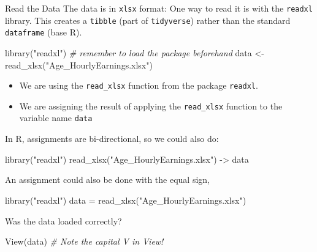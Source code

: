 \documentclass[
  11pt,
  ignorenonframetext,
  svgnames, handout, t]{beamer}
\newenvironment{Shaded}{\begin{snugshade}}{\end{snugshade}}
\newcommand{\CommentTok}[1]{\textcolor[rgb]{0.56,0.35,0.01}{\textit{#1}}}
\newcommand{\FunctionTok}[1]{\textcolor[rgb]{0.00,0.00,0.00}{#1}}
\newcommand{\NormalTok}[1]{#1}
\newcommand{\OtherTok}[1]{\textcolor[rgb]{0.56,0.35,0.01}{#1}}
\newcommand{\StringTok}[1]{\textcolor[rgb]{0.31,0.60,0.02}{#1}}
\begin{document}
\begin{frame}[fragile]{Read the Data}
\protect\hypertarget{read-the-data}{}
The data is in \texttt{xlsx} format: One way to read it is with the
\texttt{readxl} library. This creates a \texttt{tibble} (part of
\texttt{tidyverse}) rather than the standard \texttt{dataframe} (base
R).

\footnotesize

\begin{Shaded}
\begin{Highlighting}[]
\FunctionTok{library}\NormalTok{(}\StringTok{"readxl"}\NormalTok{)  }\CommentTok{\# remember to load the package beforehand}
\NormalTok{data }\OtherTok{\textless{}{-}} \FunctionTok{read\_xlsx}\NormalTok{(}\StringTok{"Age\_HourlyEarnings.xlsx"}\NormalTok{)}
\end{Highlighting}
\end{Shaded}

\normalsize

\begin{itemize}
\item
  We are using the \texttt{read\_xlsx} function from the package
  \texttt{readxl}.
\item
  We are assigning the result of applying the \texttt{read\_xlsx}
  function to the variable name \texttt{data}
\end{itemize}

In R, assignments are bi-directional, so we could also do:

\footnotesize

\begin{Shaded}
\begin{Highlighting}[]
\FunctionTok{library}\NormalTok{(}\StringTok{"readxl"}\NormalTok{)}
\FunctionTok{read\_xlsx}\NormalTok{(}\StringTok{"Age\_HourlyEarnings.xlsx"}\NormalTok{) }\OtherTok{{-}\textgreater{}}\NormalTok{ data}
\end{Highlighting}
\end{Shaded}

\normalsize

An assignment could also be done with the equal sign,

\footnotesize

\begin{Shaded}
\begin{Highlighting}[]
\FunctionTok{library}\NormalTok{(}\StringTok{"readxl"}\NormalTok{)}
\NormalTok{data }\OtherTok{=} \FunctionTok{read\_xlsx}\NormalTok{(}\StringTok{"Age\_HourlyEarnings.xlsx"}\NormalTok{)}
\end{Highlighting}
\end{Shaded}

\normalsize

Was the data loaded correctly?

\footnotesize

\begin{Shaded}
\begin{Highlighting}[]
\FunctionTok{View}\NormalTok{(data)  }\CommentTok{\# Note the capital V in View!}
\end{Highlighting}
\end{Shaded}

\normalsize
\end{frame}
\end{document}
